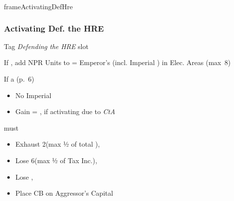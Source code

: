\documentclass[10pt]{article}
\newlength{\fhActivatingDefHre} \setlength\fhActivatingDefHre{15\baselineskip}
\begin{document}
\begin{dynamiccontents*}{frameActivatingDefHre}\begin{eubox}{\fhActivatingDefHre}
	\subsubsection*{Activating Def. the HRE }
	\begin{itemize}
		\item Tag \emph{Defending the HRE} slot
		\item If , add NPR Units to  \manpower = Emperor's \influence (incl. Imperial \influence) in Elec. Areas (max~8)
		{\botrules
		\item If a  (p.~6)
		\begin{itemize}
			\item No Imperial \manpower
			\item Gain \botpower = \authority, if activating due to \emph{CtA}
		\end{itemize}
		}
		\item {} must
		\begin{itemize}
			\item Exhaust 2\manpower (max ½ of total \manpower), 
			\item Lose 6\ducats (max ½ of Tax Inc.), 
			\item Lose , 
			\item Place CB on Aggressor's Capital
		\end{itemize}
		\item {}
	\end{itemize}
\end{eubox}\end{dynamiccontents*}
\end{document}
